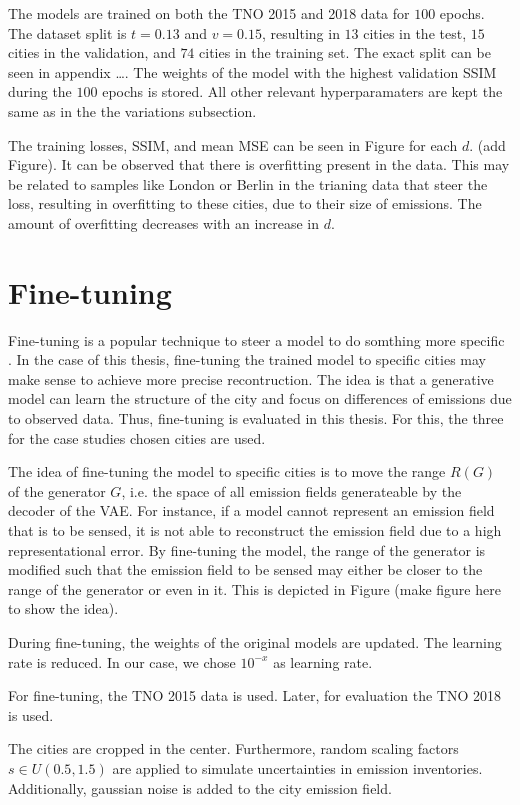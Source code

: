 The models are trained on both the TNO 2015 and 2018 data for $100$ epochs.
The dataset split is $t = 0.13$ and $v = 0.15$, resulting in $13$ cities in the test, $15$ cities in the validation, and $74$ cities in the training set.
The exact split can be seen in appendix \dots.
The weights of the model with the highest validation SSIM during the $100$ epochs is stored.
All other relevant hyperparamaters are kept the same as in the the variations subsection.

The training losses, SSIM, and mean MSE can be seen in Figure for each $d$.
(add Figure).
It can be observed that there is overfitting present in the data.
This may be related to samples like London or Berlin in the trianing data that steer the loss, resulting in overfitting to these cities, due to their size of emissions.
The amount of overfitting decreases with an increase in $d$.


\section{Fine-tuning}
Fine-tuning is a popular technique to steer a model to do somthing more specific \cite{FineTuning}.
In the case of this thesis, fine-tuning the trained model to specific cities may make sense to achieve more precise recontruction.
The idea is that a generative model can learn the structure of the city and focus on differences of emissions due to observed data.
Thus, fine-tuning is evaluated in this thesis.
For this, the three for the case studies chosen cities are used.

The idea of fine-tuning the model to specific cities is to move the range $R(G)$ of the generator $G$, i.e. the space of all emission fields generateable by the decoder of the VAE.
For instance, if a model cannot represent an emission field that is to be sensed, it is not able to reconstruct the emission field due to a high representational error.
By fine-tuning the model, the range of the generator is modified such that the emission field to be sensed may either be closer to the range of the generator or even in it.
This is depicted in Figure (make figure here to show the idea).

During fine-tuning, the weights of the original models are updated.
The learning rate is reduced.
In our case, we chose $10^{-x}$ as learning rate.

For fine-tuning, the TNO 2015 data is used.
Later, for evaluation the TNO 2018 is used.

The cities are cropped in the center.
Furthermore, random scaling factors $s \in U(0.5, 1.5)$ are applied to simulate uncertainties in emission inventories.
Additionally, gaussian noise is added to the city emission field.

